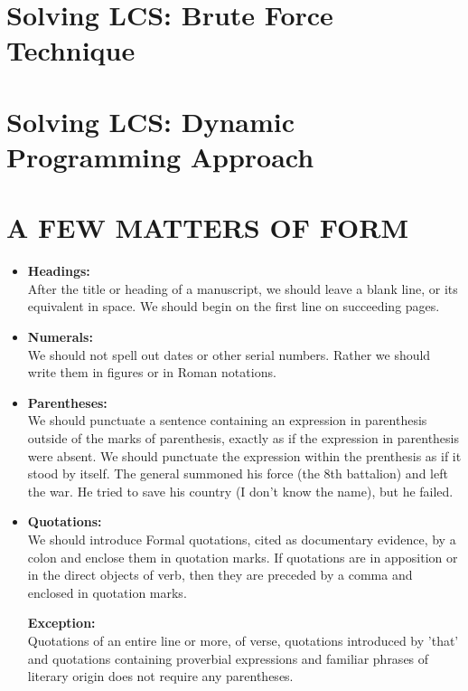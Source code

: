 \documentclass{report}
\begin{document}
    \chapter{Solving LCS: Brute Force Technique}
    
    \chapter{Solving LCS: Dynamic Programming Approach}
    \newpage
    
    \chapter{A FEW MATTERS OF FORM}
    \begin{itemize}
      \item
       \textbf{\Large{Headings:}}\\
        After the title or heading of a manuscript, we should leave a blank line, or its equivalent in space. We should begin on the first line on succeeding pages.
        \bigskip
        
      \item
       \textbf{\Large{Numerals:}}\\
        We should not spell out dates or other serial numbers. Rather we should write them in figures or in Roman notations.
        \bigskip
    
      \item
       \textbf{\Large{Parentheses:}}\\
        We should punctuate a sentence containing an expression in parenthesis 
        outside of the marks of parenthesis, exactly as if the expression in parenthesis
        were absent. We should punctuate the expression within the prenthesis as if it stood by itself.
        {The general summoned his force (the 8th battalion) and left the war.}
        {He tried to save his country (I don't know the name), but he failed.}
        \bigskip
    
      \item
       \textbf{\Large{Quotations:}}\\
        We should introduce Formal quotations, cited as documentary evidence, by a colon and enclose them in quotation marks.
        \newpage
        If quotations are in apposition or in the direct objects of verb, then they are preceded by a comma and enclosed in quotation marks.
    
       \textbf{Exception:}\\
        Quotations of an entire line or more, of verse, quotations introduced by 'that' and quotations containing proverbial expressions and familiar phrases of literary origin does not require any parentheses.
        

\end{itemize}
\end{document}
